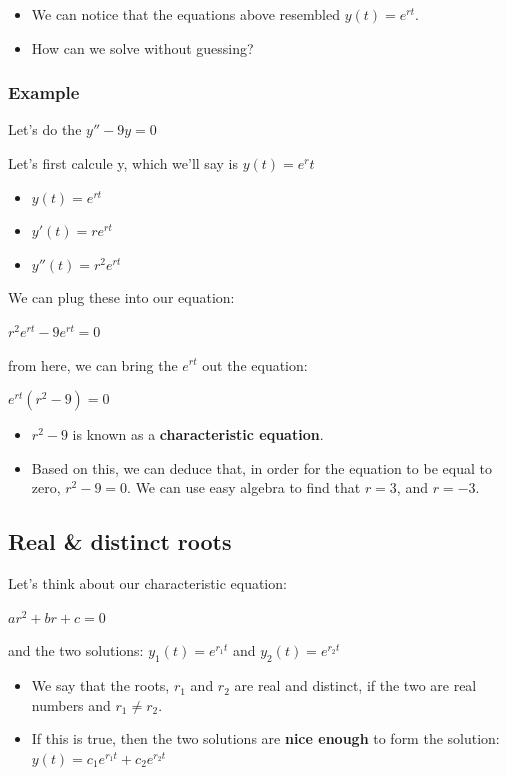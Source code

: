 \documentclass{article}
\begin{document}
\begin{itemize}
    \item We can notice that the equations above resembled $y(t) = e^{rt}$.
    \item How can we solve without guessing?
\end{itemize}

\subsubsection{Example}

Let's do the $y'' - 9y = 0$

Let's first calcule y, which we'll say is $y(t) = e^rt$

\begin{itemize}
    \item $y(t) = e^{rt}$
    \item $y'(t) = re^{rt}$
    \item $y''(t) = r^2e^{rt}$
\end{itemize}

We can plug these into our equation:

\begin{center}
    $r^2 e^{rt} - 9e^{rt} = 0$
\end{center}

from here, we can bring the $e^{rt}$ out the equation:

\begin{center}
    $e^{rt}(r^2 - 9) = 0$
\end{center}

\begin{itemize}
    \item $r^2 - 9$ is known as a \textbf{characteristic equation}.
    \item Based on this, we can deduce that, in order for the equation to be equal to zero, $r^2 - 9 = 0$. We can use easy algebra to find that $r = 3$, and $r = -3$.
\end{itemize}

\subsection{Real \& distinct roots}

Let's think about our characteristic equation:

\begin{center}
    $ar^2 + br + c = 0$
\end{center}

and the two solutions: $y_1(t) = e^{r_1 t}$ and $y_2(t) = e^{r_2 t}$
\begin{itemize}
    \item We say that the roots, $r_1$ and $r_2$ are real and distinct, if the two are real numbers and $r_1 \neq r_2$.
    \item If this is true, then the two solutions are \textbf{nice enough} to form the solution: $y(t) = c_1 e^{r_1 t} + c_2 e^{r_2 t}$
\end{itemize}
\end{document}
